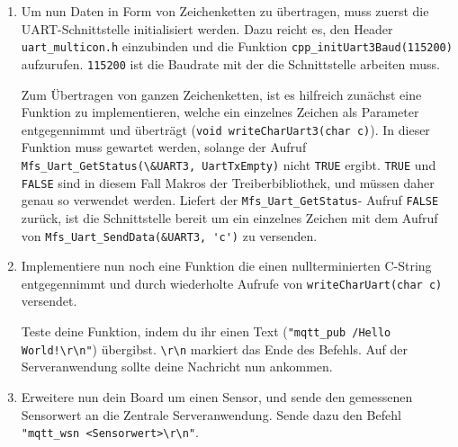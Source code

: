 \begin{enumerate}
	\item Um nun Daten in Form von Zeichenketten zu übertragen, muss zuerst die UART-Schnittstelle initialisiert werden. Dazu reicht es, den Header \lstinline|uart_multicon.h| einzubinden und die Funktion \lstinline|cpp_initUart3Baud(115200)| aufzurufen. \lstinline|115200| ist die Baudrate mit der die Schnittstelle arbeiten muss.
	
	Zum Übertragen von ganzen Zeichenketten, ist es hilfreich zunächst eine Funktion zu implementieren, welche ein einzelnes Zeichen als Parameter entgegennimmt und überträgt (\zB \lstinline|void writeCharUart3(char c)|). In dieser Funktion muss gewartet werden, solange der Aufruf \lstinline|Mfs_Uart_GetStatus(\&UART3, UartTxEmpty)| nicht \lstinline|TRUE| ergibt. \lstinline|TRUE| und \lstinline|FALSE| sind in diesem Fall Makros der Treiberbibliothek, und müssen daher genau so verwendet werden. Liefert der \lstinline|Mfs_Uart_GetStatus|- Aufruf \lstinline|FALSE| zurück, ist die Schnittstelle bereit um ein einzelnes Zeichen mit dem Aufruf von \lstinline|Mfs_Uart_SendData(&UART3, 'c')| zu versenden.
	
	\item Implementiere nun noch eine Funktion die einen nullterminierten C-String entgegennimmt und durch wiederholte Aufrufe von \lstinline|writeCharUart(char c)| versendet.
	
	Teste deine Funktion, indem du ihr einen Text (\zB \lstinline|"mqtt_pub /Hello World!\r\n"|) übergibst. \lstinline|\r\n| markiert das Ende des Befehls. Auf der Serveranwendung sollte deine Nachricht nun ankommen.
	
	\item Erweitere nun dein Board um einen Sensor, und sende den gemessenen Sensorwert an die Zentrale Serveranwendung. Sende dazu den Befehl \lstinline|"mqtt_wsn <Sensorwert>\r\n"|.
\end{enumerate}	

